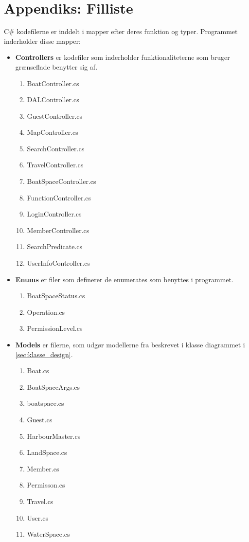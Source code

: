 \chapter{Appendiks: Filliste}
\label{cha:filliste}

C\# kodefilerne er inddelt i mapper efter deres funktion og typer.
Programmet inderholder disse mapper:

\begin{itemize}
	\item \textbf{Controllers} er kodefiler som inderholder funktionaliteterne som bruger grænseflade benytter sig af. 
		\begin{enumerate}
			\item BoatController.cs
			\item DALController.cs
			\item GuestController.cs
			\item MapController.cs
			\item SearchController.cs
			\item TravelController.cs
			\item BoatSpaceController.cs
			\item FunctionController.cs
			\item LoginController.cs
			\item MemberController.cs
			\item SearchPredicate.cs
			\item UserInfoController.cs
		\end{enumerate}	
\end{itemize}


\begin{itemize}
	\item \textbf{Enums} er filer som definerer de enumerates som benyttes i programmet.
		\begin{enumerate}
			\item BoatSpaceStatus.cs
			\item Operation.cs
			\item PermissionLevel.cs
		\end{enumerate}
\end{itemize}

\begin{itemize}
	\item \textbf{Models} er filerne, som udgør modellerne fra beskrevet i klasse diagrammet i \cref{sec:klasse_design}.
		\begin{enumerate}
			\item Boat.cs
			\item BoatSpaceArgs.cs
			\item boatspace.cs
			\item Guest.cs
			\item HarbourMaster.cs
			\item LandSpace.cs
			\item Member.cs
			\item Permisson.cs
			\item Travel.cs
			\item User.cs
			\item WaterSpace.cs

		\end{enumerate}
\end{itemize}


